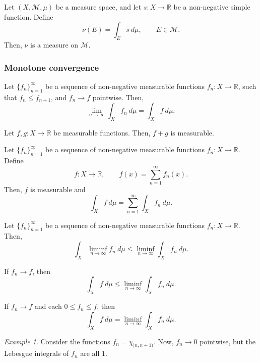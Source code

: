 \documentclass[11pt]{article}
\newcommand{\R}{\mathbb{R}}
\newcommand{\M}{\mathcal{M}}
\theoremstyle{definition}
\theoremstyle{remark}
\newtheorem*{example}{Example}
\numberwithin{equation}{section}
\begin{document}
    \begin{lemma}
        Let $(X, \M, \mu)$ be a measure space, and let $s\colon X \to \R$ be a
        non-negative simple function. Define \[
            \nu(E) = \int_E s\:d\mu, \qquad E \in \M.
        \] Then, $\nu$ is a measure on $\M$.
    \end{lemma}


    \subsubsection{Monotone convergence}

    \begin{theorem}
        Let $\{f_n\}_{n = 1}^\infty$ be a sequence of non-negative measurable
        functions $f_n\colon X \to \R$, such that $f_n \leq f_{n + 1}$, and $f_n \to
        f$ pointwise. Then, \[
            \lim_{n \to \infty} \int_X f_n\:d\mu = \int_X f\:d\mu.
        \]
    \end{theorem}

    \begin{lemma}
        Let $f,g\colon X \to \R$ be measurable functions. Then, $f + g$ is measurable.
    \end{lemma}

    \begin{theorem}
        Let $\{f_n\}_{n = 1}^\infty$ be a sequence of non-negative measurable
        functions $f_n\colon X \to \R$. Define \[
            f\colon X \to \R, \qquad f(x) = \sum_{n = 1}^\infty f_n(x).
        \] Then, $f$ is measurable and \[
            \int_X f\:d\mu = \sum_{n = 1}^\infty \int_X f_n\:d\mu.
        \]
    \end{theorem}

    \begin{theorem}[Fatou]
        Let $\{f_n\}_{n = 1}^\infty$ be a sequence of non-negative measurable
        functions $f_n\colon X \to \R$. Then, \[
            \int_X \liminf_{n \to \infty} f_n\:d\mu \leq \liminf_{n\to \infty} \int_X
            f_n\:d\mu.
        \]
    \end{theorem}
    \begin{corollary}
        If $f_n \to f$, then \[
            \int_X f\:d\mu \leq \liminf_{n\to \infty} \int_X f_n\:d\mu.
        \]
    \end{corollary}
    \begin{corollary}
        If $f_n \to f$ and each $0 \leq f_n \leq f$, then \[
            \int_X f\:d\mu = \liminf_{n\to \infty} \int_X f_n\:d\mu.
        \]
    \end{corollary}
    \begin{example}
        Consider the functions $f_n = \chi_{[n, n + 1)}$. Now, $f_n \to 0$ pointwise,
        but the Lebesgue integrals of $f_n$ are all $1$.
    \end{example}
\end{document}
